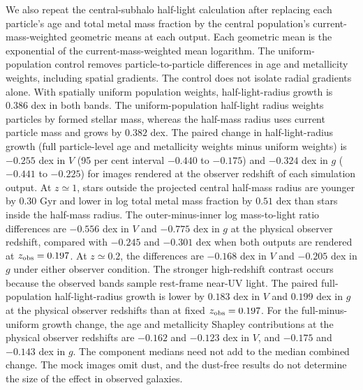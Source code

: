\documentclass[usenatbib]{mnras}
\begin{document}
We also repeat the central-subhalo half-light calculation after replacing
each particle's age and total metal mass fraction by the central population's
current-mass-weighted geometric means at each output. Each geometric mean
is the exponential of the current-mass-weighted mean logarithm. The uniform-population control
removes particle-to-particle differences in age and metallicity weights,
including spatial gradients. The control does not isolate radial gradients
alone. With spatially uniform population weights, half-light-radius growth
is $0.386$ dex in both bands. The uniform-population half-light radius
weights particles by formed stellar mass, whereas the half-mass radius uses
current particle mass and grows by $0.382$ dex. The paired change in
half-light-radius growth (full particle-level age and metallicity weights
minus uniform weights) is $-0.255$ dex in $V$ (95 per cent interval
$-0.440$ to $-0.175$) and $-0.324$ dex in $g$ ($-0.441$ to $-0.225$)
for images rendered at the observer redshift of each simulation output. At $z\simeq1$,
stars outside the projected
central half-mass radius are younger by $0.30$ Gyr and lower in log total
metal mass fraction by $0.51$ dex than stars inside the half-mass radius. The outer-minus-inner
log mass-to-light ratio differences are $-0.556$ dex in $V$ and $-0.775$ dex
in $g$ at the physical observer redshift, compared with $-0.245$ and $-0.301$
dex when both outputs are rendered at $z_{\rm obs}=0.197$. At $z\simeq0.2$,
the differences are $-0.168$ dex in $V$ and $-0.205$ dex in $g$ under either
observer condition. The stronger high-redshift contrast occurs because the
observed bands sample rest-frame near-UV light. The paired full-population
half-light-radius growth is lower by $0.183$ dex in $V$ and $0.199$ dex in
$g$ at the physical observer redshifts than at fixed $z_{\rm obs}=0.197$.
For the full-minus-uniform growth change, the age and metallicity Shapley
contributions at the physical observer redshifts are $-0.162$ and $-0.123$
dex in $V$, and $-0.175$ and $-0.143$ dex in $g$. The component medians need not add
to the median combined change. The mock images omit dust, and the dust-free
results do not determine the size of the effect in observed galaxies.
\end{document}
